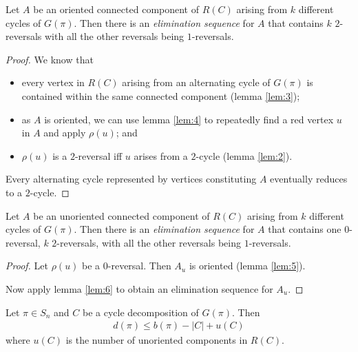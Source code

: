 \documentclass{beamer}
\theoremstyle{definition}
\def\b{\textcolor{blue}}
\begin{document}
\begin{frame}


\begin{lemma}
\label{lem:6}
Let $A$ be an oriented connected component of $R(C)$ arising from $k$ different cycles of $G(\pi)$. Then there is an \textit{elimination sequence} for $A$ that contains $k$ $2$-reversals with all the other reversals being $1$-reversals.
\end{lemma}\pause

\begin{proof}
We know that
\begin{itemize}
    \item every vertex in $R(C)$ arising from an alternating cycle of $G(\pi)$ is contained within the same connected component (lemma \ref{lem:3})\pause;
    \item  as $A$ is oriented, we can use lemma \ref{lem:4} to repeatedly find a red vertex $u$ in $A$ and apply $\rho(u)$\pause; and
    \item $\rho(u)$ is a $2$-reversal iff $u$ arises from a $2$-cycle (lemma \ref{lem:2}).
\end{itemize}\pause
Every alternating cycle represented by vertices constituting $A$ eventually reduces to a $2$-cycle.
\end{proof}

\end{frame}

\begin{frame}

\begin{lemma}
Let $A$ be an unoriented connected component of $R(C)$ arising from $k$ different cycles of $G(\pi)$. Then there is an \textit{elimination sequence} for $A$ that contains one $0$-reversal, $k$ $2$-reversals, with all the other reversals being $1$-reversals.
\end{lemma}\pause

\begin{proof}
Let $\rho(u)$ be a $0$-reversal. Then $A_u$ is oriented (lemma \ref{lem:5}). \par\pause
Now apply lemma \ref{lem:6} to obtain an elimination sequence for $A_u$.
\end{proof}\pause

\begin{theorem}
\label{thm:4}
Let $\pi \in S_n$ and $C$ be a cycle decomposition of $G(\pi)$. Then
\begin{align*}
    d(\pi) \leq b(\pi) - |C| + u(C)
\end{align*}
where $u(C)$ is the number of unoriented components in $R(C)$.
\end{theorem}

\end{frame}
\end{document}

